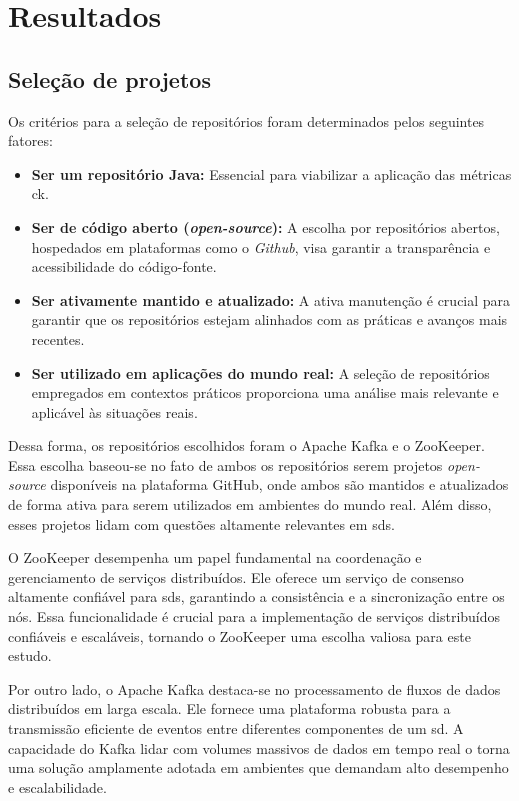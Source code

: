 \chapter{Resultados}
\label{chapter:results}

\section{Seleção de projetos}

Os critérios para a seleção de repositórios foram determinados pelos seguintes fatores:

\begin{itemize}
    \item \textbf{Ser um repositório Java:} Essencial para viabilizar a aplicação das métricas \gls{ck}.
    \item \textbf{Ser de código aberto (\textit{open-source}):} A escolha por repositórios abertos, hospedados em plataformas como o \textit{Github}, visa garantir a transparência e acessibilidade do código-fonte.
    \item \textbf{Ser ativamente mantido e atualizado:} A ativa manutenção é crucial para garantir que os repositórios estejam alinhados com as práticas e avanços mais recentes.
    \item \textbf{Ser utilizado em aplicações do mundo real:} A seleção de repositórios empregados em contextos práticos proporciona uma análise mais relevante e aplicável às situações reais.
\end{itemize}

Dessa forma, os repositórios escolhidos foram o Apache Kafka e o ZooKeeper. Essa escolha baseou-se no fato de ambos os repositórios serem projetos \textit{open-source} disponíveis na plataforma GitHub, onde ambos são mantidos e atualizados de forma ativa para serem utilizados em ambientes do mundo real. Além disso, esses projetos lidam com questões altamente relevantes em \gls{sds}.

O ZooKeeper desempenha um papel fundamental na coordenação e gerenciamento de serviços distribuídos. Ele oferece um serviço de consenso altamente confiável para \gls{sds}, garantindo a consistência e a sincronização entre os nós. Essa funcionalidade é crucial para a implementação de serviços distribuídos confiáveis e escaláveis, tornando o ZooKeeper uma escolha valiosa para este estudo.

Por outro lado, o Apache Kafka destaca-se no processamento de fluxos de dados distribuídos em larga escala. Ele fornece uma plataforma robusta para a transmissão eficiente de eventos entre diferentes componentes de um \gls{sd}. A capacidade do Kafka lidar com volumes massivos de dados em tempo real o torna uma solução amplamente adotada em ambientes que demandam alto desempenho e escalabilidade.

